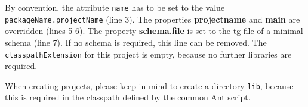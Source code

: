 \documentclass[a4paper,twoside,11pt,bibtotoc]{article}
\begin{document}
By convention, the attribute \texttt{name} has to be set to the value \texttt{packageName.projectName} (line 3).
The properties \textbf{projectname} and \textbf{main} are overridden (lines 5-6).
The property \textbf{schema.file} is set to the tg file of a minimal schema (line 7).
If no schema is required, this line can be removed.
The \texttt{classpathExtension} for this project is empty, because no further libraries are required.

When creating projects, please keep in mind to create a directory \texttt{lib}, because this is required in the classpath defined by the common Ant script.
\clearpage
 
%
%
%
\end{document}
